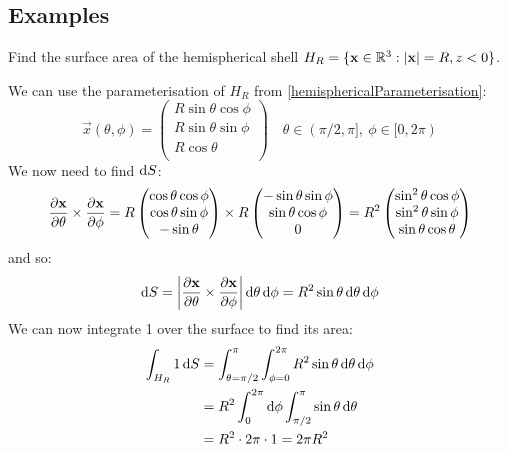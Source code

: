 \documentclass[../main.tex]{subfiles}
\begin{document}
\subsection{Examples}
\begin{example}
  Find the surface area of the hemispherical shell $H_R = \{\mathbf{\bm{x}} \in \mathbb{R}^3: |\mathbf{\bm{x}}| = R, z < 0\}$.

  We can use the parameterisation of $H_R$ from \cref{hemisphericalParameterisation}:
  \[
    \vec{x}(\theta, \phi) = \begin{pmatrix}
    R \sin \theta \cos \phi \\
    R \sin \theta \sin \phi \\
    R \cos \theta \\
    \end{pmatrix} \quad \theta \in (\pi/2, \pi],\ \phi \in [0, 2\pi)
  \]
  We now need to find $\d{S}$:
  \[
    \pderiv{\vec{x}}{\theta} \times \pderiv{\vec{x}}{\phi} = R \begin{pmatrix}
    \cos \theta \cos \phi \\
    \cos \theta \sin \phi \\
    -\sin \theta \\
    \end{pmatrix} \times R \begin{pmatrix}
    -\sin \theta \sin \phi \\
    \sin \theta \cos \phi \\
    0 \\
    \end{pmatrix} = R^2 \begin{pmatrix}
    \sin^2 \theta \cos \phi \\
    \sin^2 \theta \sin \phi \\
    \sin \theta \cos \theta \\
    \end{pmatrix}
  \]
  and so:
  \[
    \d{S} = \abs{\pderiv{\vec{x}}{\theta} \times \pderiv{\vec{x}}{\phi}} \d{\theta} \d{\phi} = R^2 \sin \theta \d{\theta} \d{\phi}
  \]
  We can now integrate 1 over the surface to find its area:
  \begin{align*}
    \int_{H_R} 1 \d{S} &= \int_{\theta = \pi/2}^{\pi} \int_{\phi = 0}^{2\pi} R^2 \sin \theta \d{\theta} \d{\phi} \\
                       &= R^2 \int_{0}^{2\pi} \d{\phi}  \int_{\pi/2}^{\pi} \sin \theta \d{\theta} \\
                       &= R^2 \cdot 2\pi \cdot 1 = 2 \pi R^2
  \end{align*}
\end{example}
\end{document}
